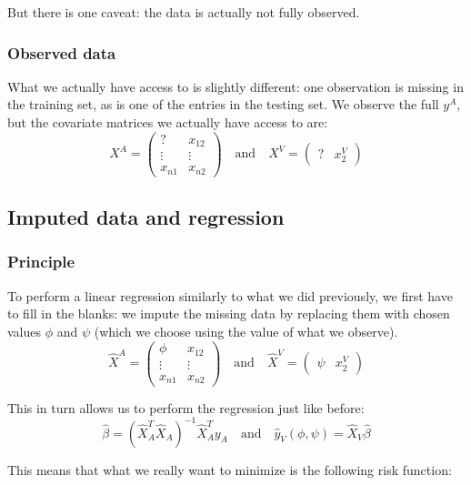 \documentclass[12pt, a4paper]{memoir}
\begin{document}
But there is one caveat: the data is actually not fully observed.

			\subsubsection{Observed data}
What we actually have access to is slightly different: one observation is missing in the training set, as is one of the entries in the testing set. We observe the full $y^A$, but the covariate matrices we actually have access to are:
\begin{equation*}
X^A = 
\begin{pmatrix}
? & x_{12} \\
\vdots & \vdots \\
x_{n1} & x_{n2}
\end{pmatrix}
\quad \mathrm{and} \quad
X^V = 
\begin{pmatrix}
? & x_{2}^V
\end{pmatrix}
\end{equation*}

		\subsection{Imputed data and regression}
			\subsubsection{Principle}
To perform a linear regression similarly to what we did previously, we first have to fill in the blanks: we impute the missing data by replacing them with chosen values $\phi$ and $\psi$ (which we choose using the value of what we observe).
\begin{equation*}
\hat{X}^A = 
\begin{pmatrix}
\phi & x_{12} \\
\vdots & \vdots \\
x_{n1} & x_{n2}
\end{pmatrix}
\quad \mathrm{and} \quad
\hat{X}^V = 
\begin{pmatrix}
\psi & x_{2}^V
\end{pmatrix}
\end{equation*}

This in turn allows us to perform the regression just like before:
$$
\hat{\beta} = (\hat{X}_A^T \hat{X}_A)^{-1} \hat{X}_A^T y_A 
\quad \mathrm{and} \quad
\hat{y}_V (\phi, \psi) = \hat{X}_V \hat{\beta} 
$$

This means that what we really want to minimize is the following risk function:
\end{document}

